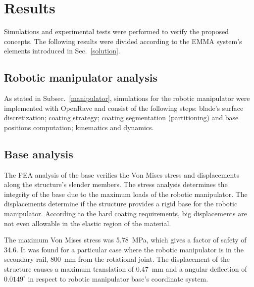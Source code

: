 \section{Results}



Simulations and experimental tests were performed to verify the proposed
concepts. The following results were divided according to the EMMA system's
elements introduced in Sec.~\ref{solution}. 


\subsection{Robotic manipulator analysis}

As stated in Subsec.~\ref{manipulator}, simulations for the robotic
manipulator were implemented with OpenRave and consist of the following steps:
blade's surface discretization; coating strategy; coating segmentation
(partitioning) and base positions computation; kinematics and dynamics.

\subsection{Base analysis}
The FEA analysis of the base verifies the Von Mises stress and displacements
along the structure's slender members. The stress analysis determines the
integrity of the base due to the maximum loads of the robotic manipulator. The
displacements determine if the structure provides a rigid base for the robotic
manipulator. According to the hard coating requirements, big displacements are
not even allowable in the elastic region of the material. %

The maximum Von Mises stress was 5.78~MPa, which gives a factor of safety of
34.6. It was found for a particular case where the robotic manipulator is in
the secondary rail, 800~mm from the rotational joint. The displacement of the
structure causes a maximum translation of 0.47~mm and a angular deflection of
$0.0149^{\circ}$ in respect to robotic manipulator base's coordinate system.


